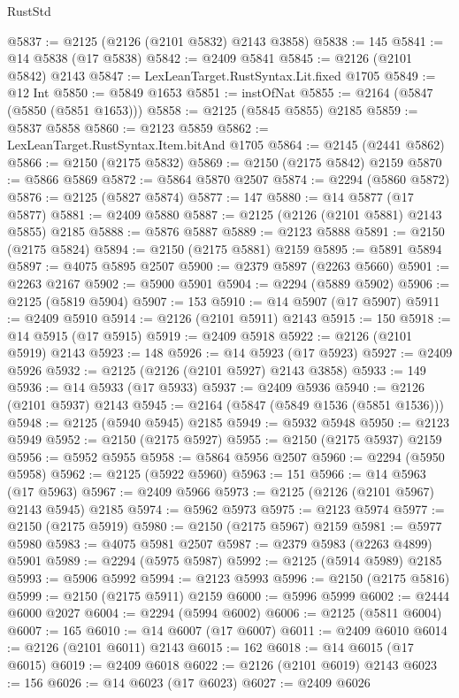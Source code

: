 \begin{lexlean}{RustStd}
\begin{coremodule}
@5837 := @2125 (@2126 (@2101 @5832) @2143 @3858)
@5838 := 145
@5841 := @14 @5838 (@17 @5838)
@5842 := @2409 @5841
@5845 := @2126 (@2101 @5842) @2143
@5847 := LexLeanTarget.RustSyntax.Lit.fixed @1705
@5849 := @12 Int
@5850 := @5849 @1653
@5851 := instOfNat
@5855 := @2164 (@5847 (@5850 (@5851 @1653)))
@5858 := @2125 (@5845 @5855) @2185
@5859 := @5837 @5858
@5860 := @2123 @5859
@5862 := LexLeanTarget.RustSyntax.Item.bitAnd @1705
@5864 := @2145 (@2441 @5862)
@5866 := @2150 (@2175 @5832)
@5869 := @2150 (@2175 @5842) @2159
@5870 := @5866 @5869
@5872 := @5864 @5870 @2507
@5874 := @2294 (@5860 @5872)
@5876 := @2125 (@5827 @5874)
@5877 := 147
@5880 := @14 @5877 (@17 @5877)
@5881 := @2409 @5880
@5887 := @2125 (@2126 (@2101 @5881) @2143 @5855) @2185
@5888 := @5876 @5887
@5889 := @2123 @5888
@5891 := @2150 (@2175 @5824)
@5894 := @2150 (@2175 @5881) @2159
@5895 := @5891 @5894
@5897 := @4075 @5895 @2507
@5900 := @2379 @5897 (@2263 @5660)
@5901 := @2263 @2167
@5902 := @5900 @5901
@5904 := @2294 (@5889 @5902)
@5906 := @2125 (@5819 @5904)
@5907 := 153
@5910 := @14 @5907 (@17 @5907)
@5911 := @2409 @5910
@5914 := @2126 (@2101 @5911) @2143
@5915 := 150
@5918 := @14 @5915 (@17 @5915)
@5919 := @2409 @5918
@5922 := @2126 (@2101 @5919) @2143
@5923 := 148
@5926 := @14 @5923 (@17 @5923)
@5927 := @2409 @5926
@5932 := @2125 (@2126 (@2101 @5927) @2143 @3858)
@5933 := 149
@5936 := @14 @5933 (@17 @5933)
@5937 := @2409 @5936
@5940 := @2126 (@2101 @5937) @2143
@5945 := @2164 (@5847 (@5849 @1536 (@5851 @1536)))
@5948 := @2125 (@5940 @5945) @2185
@5949 := @5932 @5948
@5950 := @2123 @5949
@5952 := @2150 (@2175 @5927)
@5955 := @2150 (@2175 @5937) @2159
@5956 := @5952 @5955
@5958 := @5864 @5956 @2507
@5960 := @2294 (@5950 @5958)
@5962 := @2125 (@5922 @5960)
@5963 := 151
@5966 := @14 @5963 (@17 @5963)
@5967 := @2409 @5966
@5973 := @2125 (@2126 (@2101 @5967) @2143 @5945) @2185
@5974 := @5962 @5973
@5975 := @2123 @5974
@5977 := @2150 (@2175 @5919)
@5980 := @2150 (@2175 @5967) @2159
@5981 := @5977 @5980
@5983 := @4075 @5981 @2507
@5987 := @2379 @5983 (@2263 @4899) @5901
@5989 := @2294 (@5975 @5987)
@5992 := @2125 (@5914 @5989) @2185
@5993 := @5906 @5992
@5994 := @2123 @5993
@5996 := @2150 (@2175 @5816)
@5999 := @2150 (@2175 @5911) @2159
@6000 := @5996 @5999
@6002 := @2444 @6000 @2027
@6004 := @2294 (@5994 @6002)
@6006 := @2125 (@5811 @6004)
@6007 := 165
@6010 := @14 @6007 (@17 @6007)
@6011 := @2409 @6010
@6014 := @2126 (@2101 @6011) @2143
@6015 := 162
@6018 := @14 @6015 (@17 @6015)
@6019 := @2409 @6018
@6022 := @2126 (@2101 @6019) @2143
@6023 := 156
@6026 := @14 @6023 (@17 @6023)
@6027 := @2409 @6026

\end{coremodule}
\end{lexlean}
